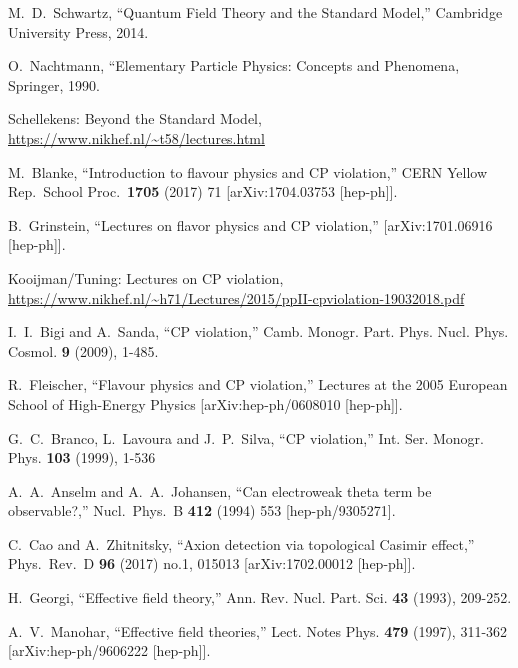 \documentclass[12pt]{article}
\numberwithin{equation}{section}
\begin{document}
\begin{thebibliography}{999}
M.~D.~Schwartz, ``Quantum Field Theory and the Standard Model,'' Cambridge University Press, 2014.

O.~Nachtmann, ``Elementary Particle Physics: Concepts and Phenomena, Springer, 1990.

 Schellekens: Beyond the Standard Model, 
\url{https://www.nikhef.nl/~t58/lectures.html}

  M.~Blanke,
  ``Introduction to flavour physics and CP violation,''
  CERN Yellow Rep.\ School Proc.\  {\bf 1705} (2017) 71
  [arXiv:1704.03753 [hep-ph]].

B.~Grinstein, ``Lectures on flavor physics and CP violation,''
[arXiv:1701.06916 [hep-ph]].

 Kooijman/Tuning: Lectures on CP violation,\\
\url{https://www.nikhef.nl/~h71/Lectures/2015/ppII-cpviolation-19032018.pdf}

I.~I.~Bigi and A.~Sanda, ``CP violation,''
Camb. Monogr. Part. Phys. Nucl. Phys. Cosmol. \textbf{9} (2009), 1-485.

R.~Fleischer, ``Flavour physics and CP violation,'' Lectures at the 2005 European School of High-Energy Physics [arXiv:hep-ph/0608010 [hep-ph]].

G.~C.~Branco, L.~Lavoura and J.~P.~Silva,
``CP violation,'' Int. Ser. Monogr. Phys. \textbf{103} (1999), 1-536

A.~A.~Anselm and A.~A.~Johansen,
  ``Can electroweak theta term be observable?,'' Nucl.\ Phys.\ B {\bf 412}
  (1994) 553 [hep-ph/9305271].

  C.~Cao and A.~Zhitnitsky,
  ``Axion detection via topological Casimir effect,''
  Phys.\ Rev.\ D {\bf 96} (2017) no.1,  015013 [arXiv:1702.00012 [hep-ph]].

H.~Georgi,
``Effective field theory,''
Ann. Rev. Nucl. Part. Sci. \textbf{43} (1993), 209-252.

A.~V.~Manohar,
``Effective field theories,''
Lect. Notes Phys. \textbf{479} (1997), 311-362
[arXiv:hep-ph/9606222 [hep-ph]].


\end{thebibliography}
\end{document}
